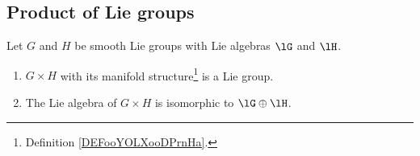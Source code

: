 \subsection{Product of Lie groups}

\begin{proposition}	  \label{PROPooKITOooTcsIiu}
	Let \( G\) and \( H \) be smooth Lie groups with Lie algebras \( \lG\) and \( \lH\).
	\begin{enumerate}
		\item
		      \( G\times H\) with its manifold structure\footnote{Definition \ref{DEFooYOLXooDPrnHa}.} is a Lie group.
		\item
		      The Lie algebra of \( G\times H\) is isomorphic to \( \lG\oplus\lH\).
	\end{enumerate}
\end{proposition}

